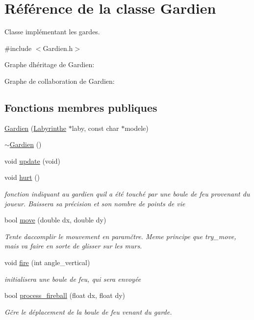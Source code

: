 \hypertarget{classGardien}{}\section{Référence de la classe Gardien}
\label{classGardien}


Classe implémentant les gardes.  




{\ttfamily \#include $<$Gardien.\+h$>$}



Graphe d\textquotesingle{}héritage de Gardien\+:


Graphe de collaboration de Gardien\+:
\subsection*{Fonctions membres publiques}
\begin{DoxyCompactItemize}
\item 
\hyperlink{classGardien_afc1e450fa7ad919d801475b34ced6e8d}{Gardien} (\hyperlink{classLabyrinthe}{Labyrinthe} $\ast$laby, const char $\ast$modele)
\item 
\hyperlink{classGardien_afef6202d924fef9d882bb40dfc4ac9fb}{$\sim$\+Gardien} ()
\item 
void \hyperlink{classGardien_aed498f0d6bbb526e0373a914ba6bf9aa}{update} (void)
\item 
void \hyperlink{classGardien_ac4ba490e309de80c1449fc5baef90390}{hurt} ()
\begin{DoxyCompactList}\small\item\em fonction indiquant au gardien qu\textquotesingle{}il a été touché par une boule de feu provenant du joueur. Baissera sa précision et son nombre de points de vie \end{DoxyCompactList}\item 
bool \hyperlink{classGardien_a1de6511bda736ad456457c51fa9d8d68}{move} (double dx, double dy)
\begin{DoxyCompactList}\small\item\em Tente d\textquotesingle{}accomplir le mouvement en paramčtre. Meme principe que try\+\_\+move, mais va faire en sorte de glisser sur les murs. \end{DoxyCompactList}\item 
void \hyperlink{classGardien_aa0e2e0fbdca75ddc5e0501b5498d5f55}{fire} (int angle\+\_\+vertical)
\begin{DoxyCompactList}\small\item\em initialisera une boule de feu, qui sera envoyée \end{DoxyCompactList}\item 
bool \hyperlink{classGardien_ad1d0f6aca8be28477e16dae7a30301b8}{process\+\_\+fireball} (float dx, float dy)
\begin{DoxyCompactList}\small\item\em Gčre le déplacement de la boule de feu venant du garde. \end{DoxyCompactList}\end{DoxyCompactItemize}
